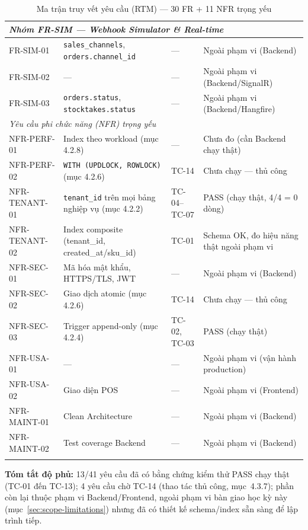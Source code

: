 \begin{longtable}{|p{2.1cm}|p{5.2cm}|p{3.3cm}|p{2.6cm}|}
\multicolumn{4}{|l|}{\textit{Nhóm FR-SIM — Webhook Simulator \& Real-time}} \\ \hline
FR-SIM-01 & \texttt{sales\_channels}, \texttt{orders.channel\_id} & — & Ngoài phạm vi (Backend) \\ \hline
FR-SIM-02 & — & — & Ngoài phạm vi (Backend/SignalR) \\ \hline
FR-SIM-03 & \texttt{orders.status}, \texttt{stocktakes.status} & — & Ngoài phạm vi (Backend/Hangfire) \\ \hline

\multicolumn{4}{|l|}{\textit{Yêu cầu phi chức năng (NFR) trọng yếu}} \\ \hline
NFR-PERF-01 & Index theo workload (mục 4.2.8) & — & Chưa đo (cần Backend chạy thật) \\ \hline
NFR-PERF-02 & \texttt{WITH (UPDLOCK, ROWLOCK)} (mục 4.2.6) & TC-14 & Chưa chạy — thủ công \\ \hline
NFR-TENANT-01 & \texttt{tenant\_id} trên mọi bảng nghiệp vụ (mục 4.2.2) & TC-04–TC-07 & PASS (chạy thật, 4/4 = 0 dòng) \\ \hline
NFR-TENANT-02 & Index composite (tenant\_id, created\_at/sku\_id) & TC-01 & Schema OK, đo hiệu năng thật ngoài phạm vi \\ \hline
NFR-SEC-01 & Mã hóa mật khẩu, HTTPS/TLS, JWT & — & Ngoài phạm vi (Backend) \\ \hline
NFR-SEC-02 & Giao dịch atomic (mục 4.2.6) & TC-14 & Chưa chạy — thủ công \\ \hline
NFR-SEC-03 & Trigger append-only (mục 4.2.4) & TC-02, TC-03 & PASS (chạy thật) \\ \hline
NFR-USA-01 & — & — & Ngoài phạm vi (vận hành production) \\ \hline
NFR-USA-02 & Giao diện POS & — & Ngoài phạm vi (Frontend) \\ \hline
NFR-MAINT-01 & Clean Architecture & — & Ngoài phạm vi (Backend) \\ \hline
NFR-MAINT-02 & Test coverage Backend & — & Ngoài phạm vi (Backend) \\ \hline

\caption{Ma trận truy vết yêu cầu (RTM) — 30 FR + 11 NFR trọng yếu}
\label{tab:rtm-full}
\end{longtable}

\textbf{Tóm tắt độ phủ:} 13/41 yêu cầu đã có bằng chứng kiểm thử PASS chạy thật (TC-01 đến TC-13); 4 yêu cầu chờ TC-14 (thao tác thủ công, mục~4.3.7); phần còn lại thuộc phạm vi Backend/Frontend, ngoài phạm vi bàn giao học kỳ này (mục~\ref{sec:scope-limitations}) nhưng đã có thiết kế schema/index sẵn sàng để lập trình tiếp.

